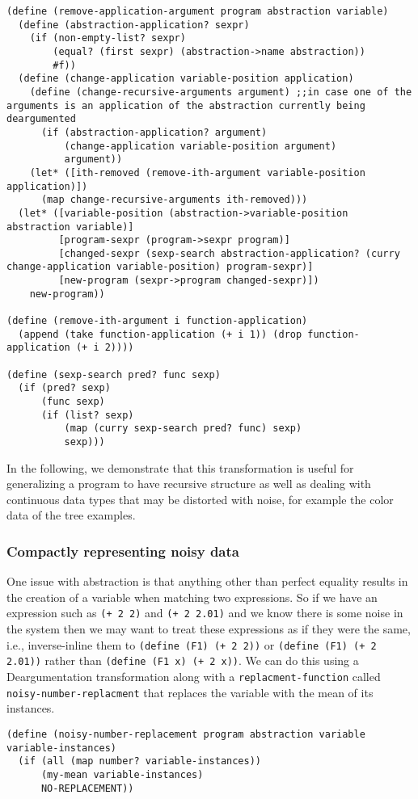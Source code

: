 \documentclass[a4paper,10pt]{article}
\begin{document}
\begin{lstlisting}[frame=trbl]
(define (remove-application-argument program abstraction variable)
  (define (abstraction-application? sexpr)
    (if (non-empty-list? sexpr)
        (equal? (first sexpr) (abstraction->name abstraction))
        #f))
  (define (change-application variable-position application)
    (define (change-recursive-arguments argument) ;;in case one of the arguments is an application of the abstraction currently being deargumented
      (if (abstraction-application? argument)
          (change-application variable-position argument)
          argument))
    (let* ([ith-removed (remove-ith-argument variable-position application)])
      (map change-recursive-arguments ith-removed)))
  (let* ([variable-position (abstraction->variable-position abstraction variable)]
         [program-sexpr (program->sexpr program)]
         [changed-sexpr (sexp-search abstraction-application? (curry change-application variable-position) program-sexpr)]
         [new-program (sexpr->program changed-sexpr)])
    new-program))

(define (remove-ith-argument i function-application)
  (append (take function-application (+ i 1)) (drop function-application (+ i 2))))

(define (sexp-search pred? func sexp)
  (if (pred? sexp)
      (func sexp)
      (if (list? sexp)
          (map (curry sexp-search pred? func) sexp)
          sexp)))
\end{lstlisting}
In the following, we demonstrate that this transformation is useful for generalizing a program to have recursive structure as well as dealing with continuous data types that may be distorted with noise, for example the color data of the tree examples.

\subsubsection{Compactly representing noisy data}
One issue with abstraction is that anything other than perfect equality results in the creation of a variable when matching two expressions.  So if we have an expression such as \texttt{(+ 2 2)} and \texttt{(+ 2 2.01)} and we know there is some noise in the system then we may want to treat these expressions as if they were the same, i.e., inverse-inline them to \texttt{(define (F1) (+ 2 2))} or \texttt{(define (F1) (+ 2 2.01))} rather than \texttt{(define (F1 x) (+ 2 x))}.  We can do this using a Deargumentation transformation along with a \texttt{replacment-function} called \texttt{noisy-number-replacment} that replaces the variable with the mean of its instances.  
\begin{lstlisting}[frame=trbl]
(define (noisy-number-replacement program abstraction variable variable-instances)
  (if (all (map number? variable-instances))
      (my-mean variable-instances)
      NO-REPLACEMENT))
\end{lstlisting}
\end{document}
